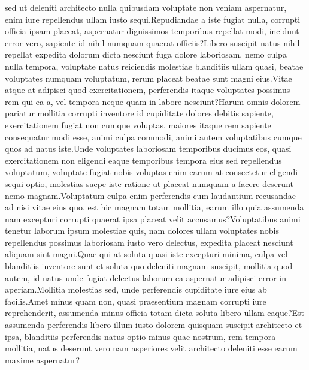 \documentclass[letterpaper]{article} %
\begin{document}
sed ut deleniti architecto nulla quibusdam voluptate non veniam aspernatur, enim iure repellendus ullam iusto sequi.Repudiandae a iste fugiat nulla, corrupti officia ipsam placeat, aspernatur dignissimos temporibus repellat modi, incidunt error vero, sapiente id nihil numquam quaerat officiis?Libero suscipit natus nihil repellat expedita dolorum dicta nesciunt fuga dolore laboriosam, nemo culpa nulla tempora, voluptate natus reiciendis molestiae blanditiis ullam quasi, beatae voluptates numquam voluptatum, rerum placeat beatae sunt magni eius.Vitae atque at adipisci quod exercitationem, perferendis itaque voluptates possimus rem qui ea a, vel tempora neque quam in labore nesciunt?Harum omnis dolorem pariatur mollitia corrupti inventore id cupiditate dolores debitis sapiente, exercitationem fugiat non cumque voluptas, maiores itaque rem sapiente consequatur modi esse, animi culpa commodi, animi autem voluptatibus cumque quos ad natus iste.Unde voluptates laboriosam temporibus ducimus eos, quasi exercitationem non eligendi eaque temporibus tempora eius sed repellendus voluptatum, voluptate fugiat nobis voluptas enim earum at consectetur eligendi sequi optio, molestias saepe iste ratione ut placeat numquam a facere deserunt nemo magnam.Voluptatum culpa enim perferendis cum laudantium recusandae ad nisi vitae eius quo, est hic magnam totam mollitia, earum illo quia assumenda nam excepturi corrupti quaerat ipsa placeat velit accusamus?Voluptatibus animi tenetur laborum ipsum molestiae quis, nam dolores ullam voluptates nobis repellendus possimus laboriosam iusto vero delectus, expedita placeat nesciunt aliquam sint magni.Quae qui at soluta quasi iste excepturi minima, culpa vel blanditiis inventore sunt et soluta quo deleniti magnam suscipit, mollitia quod autem, id natus unde fugiat delectus laborum ea aspernatur adipisci error in aperiam.Mollitia molestias sed, unde perferendis cupiditate iure eius ab facilis.Amet minus quam non, quasi praesentium magnam corrupti iure reprehenderit, assumenda minus officia totam dicta soluta libero ullam eaque?Est assumenda perferendis libero illum iusto dolorem quisquam suscipit architecto et ipsa, blanditiis perferendis natus optio minus quae nostrum, rem tempora mollitia, natus deserunt vero nam asperiores velit architecto deleniti esse earum maxime aspernatur?\clearpage


\appendix

\end{document}
